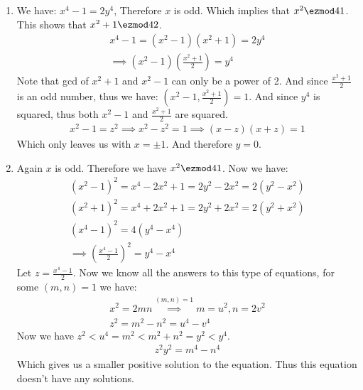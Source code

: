 \begin{enumerate}[label=\ilabel]
    \item
        We have: $x^4 - 1 = 2y^4$, Therefore $x$ is odd. Which implies that $x^2 \ezmod 4 1$. This shows that $x^2 + 1 \ezmod 4 2$.
        \begin{gather*}
            x^4 - 1 = (x^2 - 1)(x^2 + 1) = 2y^4 \\
            \implies (x^2 - 1) (\frac{x^2 + 1}{2}) = y^4
        \end{gather*}
        Note that gcd of $x^2 + 1$ and $x^2 - 1$ can only be a power of 2. And since $\frac{x^2 + 1}{2}$ is an odd number, thus we have: $(x^2 - 1, \frac{x^2 + 1}{2}) = 1$. And since $y^4$ is squared, thus both $x^2 - 1$ and $\frac{x^2 + 1}{2}$ are squared. 
        \begin{gather*}
            x^2 - 1 = z^2 \implies x^2 - z^2 = 1 \implies (x - z)(x + z) = 1
        \end{gather*}
        Which only leaves us with $x = \pm 1$. And therefore $y = 0$.

    \item 
        Again $x$ is odd. Therefore we have $x^2 \ezmod 4 1$. Now we have:
        \begin{gather*}
            (x^2 - 1)^2 = x^4 - 2x^2 + 1 = 2y^2 - 2x^2 = 2(y^2 - x^2) \\
            (x^2 + 1)^2 = x^4 + 2x^2 + 1 = 2y^2 + 2x^2 = 2(y^2 + x^2) \\
            (x^4 - 1)^2 = 4 (y^4 - x^4) \\
            \implies (\frac{x^4 - 1}{2})^2  = y^4 - x^4 
        \end{gather*}
        Let $z = \frac{x^4 - 1}{2}$. Now we know all the answers to this type of equations, for some $(m, n) = 1$ we have:
        \begin{gather*}
            x^2 = 2mn \overset{(m, n) = 1}{\implies} m = u^2 , n = 2v^2 \\
            z^2 = m^2 - n^2 = u^4 - v^4
        \end{gather*}
        Now we have $z^2 < u^4 = m^2 < m^2 + n^2 = y^2 < y^4$. 
        \begin{gather*}
            z^2y^2 = m^4 - n^4
        \end{gather*}
        Which gives us a smaller positive solution to the equation. Thus this equation doesn't have any solutions.
\end{enumerate}